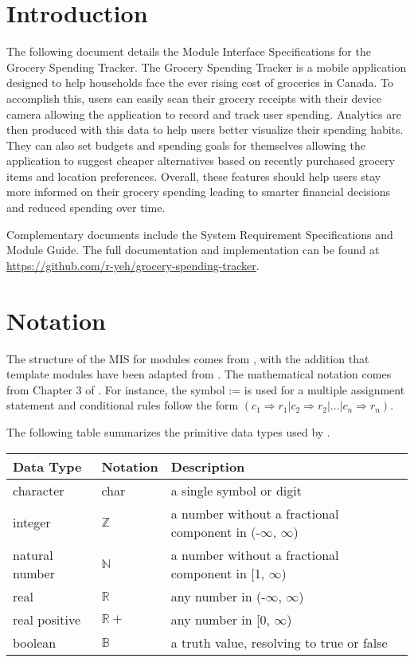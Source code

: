\documentclass[12pt, titlepage]{article}
\begin{document}
\section{Introduction}

The following document details the Module Interface Specifications for
the Grocery Spending Tracker. The Grocery Spending Tracker is a mobile application
designed to help households face the ever rising cost of groceries in Canada.
To accomplish this, users can easily scan their grocery receipts with their device camera allowing the
application to record and track user spending. Analytics are then produced
with this data to help users better visualize their spending habits. They can also
set budgets and spending goals for themselves allowing the application to
suggest cheaper alternatives based on recently purchased grocery items and
location preferences. Overall, these features should help users stay more informed on their
grocery spending leading to smarter financial decisions and reduced spending over time.

Complementary documents include the System Requirement Specifications
and Module Guide.  The full documentation and implementation can be
found at \url{https://github.com/r-yeh/grocery-spending-tracker}.

\section{Notation}

The structure of the MIS for modules comes from \citet{HoffmanAndStrooper1995},
with the addition that template modules have been adapted from
\cite{GhezziEtAl2003}.  The mathematical notation comes from Chapter 3 of
\citet{HoffmanAndStrooper1995}.  For instance, the symbol := is used for a
multiple assignment statement and conditional rules follow the form $(c_1
\Rightarrow r_1 | c_2 \Rightarrow r_2 | ... | c_n \Rightarrow r_n )$.

The following table summarizes the primitive data types used by \progname. 

\begin{center}
\renewcommand{\arraystretch}{1.2}
\noindent 
\begin{tabular}{l l p{7.5cm}} 
\toprule 
\textbf{Data Type} & \textbf{Notation} & \textbf{Description}\\ 
\midrule
character & char & a single symbol or digit\\
integer & $\mathbb{Z}$ & a number without a fractional component in (-$\infty$, $\infty$) \\
natural number & $\mathbb{N}$ & a number without a fractional component in [1, $\infty$) \\
real & $\mathbb{R}$ & any number in (-$\infty$, $\infty$)\\
real positive & $\mathbb{R}+$ & any number in [0, $\infty$) \\
boolean & $\mathbb{B}$ & a truth value, resolving to true or false \\
\bottomrule
\end{tabular} 
\end{center}
\end{document}
